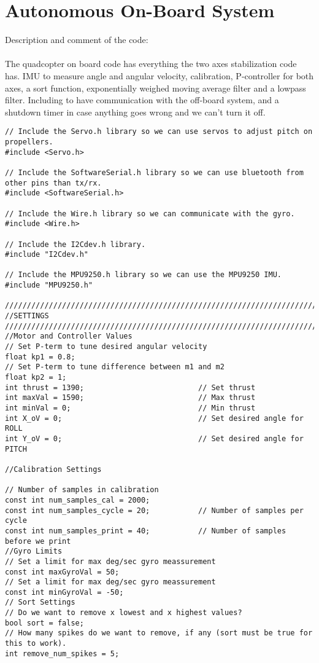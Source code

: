 \section{Autonomous On-Board System}

Description and comment of the code: \\
\\
The quadcopter on board code has everything the two axes stabilization code has. IMU to measure angle and angular velocity, calibration, P-controller for both axes, a sort function, exponentially weighed moving average filter and a lowpass filter. Including to have communication with the off-board system, and a shutdown timer in case anything goes wrong and we can't turn it off. 

\begin{lstlisting}
// Include the Servo.h library so we can use servos to adjust pitch on propellers.
#include <Servo.h> 

// Include the SoftwareSerial.h library so we can use bluetooth from other pins than tx/rx.
#include <SoftwareSerial.h>   

// Include the Wire.h library so we can communicate with the gyro.
#include <Wire.h>        

// Include the I2Cdev.h library.
#include "I2Cdev.h"                        

// Include the MPU9250.h library so we can use the MPU9250 IMU.
#include "MPU9250.h"                       

//////////////////////////////////////////////////////////////////////////////
//SETTINGS
//////////////////////////////////////////////////////////////////////////////
//Motor and Controller Values
// Set P-term to tune desired angular velocity
float kp1 = 0.8;   
// Set P-term to tune difference between m1 and m2
float kp2 = 1;                              
int thrust = 1390;                          // Set thrust
int maxVal = 1590;                          // Max thrust
int minVal = 0;                             // Min thrust
int X_oV = 0;                               // Set desired angle for ROLL
int Y_oV = 0;                               // Set desired angle for PITCH

//Calibration Settings

// Number of samples in calibration
const int num_samples_cal = 2000;           
const int num_samples_cycle = 20;           // Number of samples per cycle
const int num_samples_print = 40;           // Number of samples before we print
//Gyro Limits
// Set a limit for max deg/sec gyro meassurement
const int maxGyroVal = 50;             
// Set a limit for max deg/sec gyro meassurement
const int minGyroVal = -50;                 
// Sort Settings
// Do we want to remove x lowest and x highest values?
bool sort = false;
// How many spikes do we want to remove, if any (sort must be true for this to work).
int remove_num_spikes = 5;                  



\end{lstlisting}
